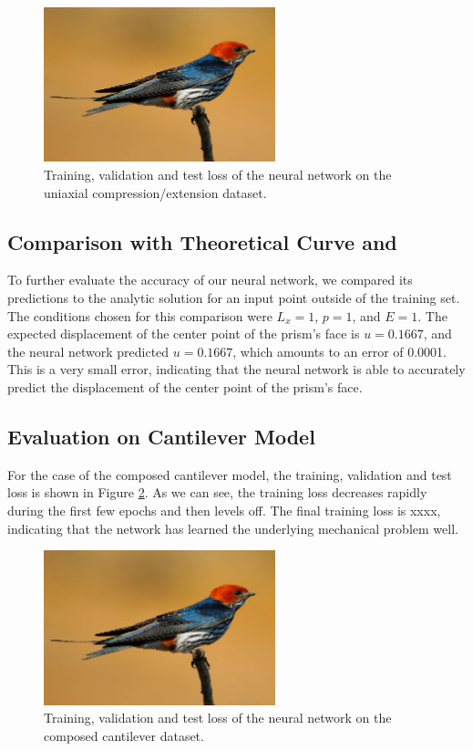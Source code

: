 \documentclass[11pt]{scrartcl} %
\begin{document}
\begin{figure}[h]
\centering
\includegraphics[width=0.6\textwidth]{Figures/swallow.jpg}
\caption{Training, validation and test loss of the neural network on the uniaxial compression/extension dataset.}
\label{fig:train_loss}
\end{figure}

\subsection{Comparison with Theoretical Curve and }
To further evaluate the accuracy of our neural network, we compared its predictions to the analytic solution for an input point outside of the training set. The conditions chosen for this comparison were $L_x = 1$, $p = 1$, and $E = 1$. The expected displacement of the center point of the prism's face is $u = 0.1667$, and the neural network predicted $u = 0.1667$, which amounts to an error of 0.0001. This is a very small error, indicating that the neural network is able to accurately predict the displacement of the center point of the prism's face.
\subsection{Evaluation on Cantilever Model}
For the case of the composed cantilever model, the training, validation and test loss is shown in Figure \ref{fig:composed_cantilever_loss}. As we can see, the training loss decreases rapidly during the first few epochs and then levels off. The final training loss is xxxx, indicating that the network has learned the underlying mechanical problem well.

\begin{figure}[h]
\centering
\includegraphics[width=0.6\textwidth]{Figures/swallow.jpg}
\caption{Training, validation and test loss of the neural network on the composed cantilever dataset.}
\label{fig:composed_cantilever_loss}
\end{figure}
\end{document}
